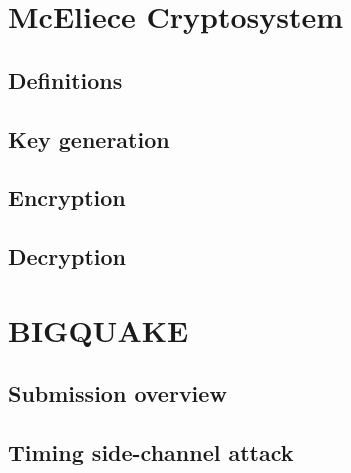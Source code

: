 \section{McEliece Cryptosystem}
\subsection{Definitions}
\subsection{Key generation}
\subsection{Encryption}
\subsection{Decryption}
\section{BIGQUAKE}
\subsection{Submission overview}
\subsection{Timing side-channel attack}